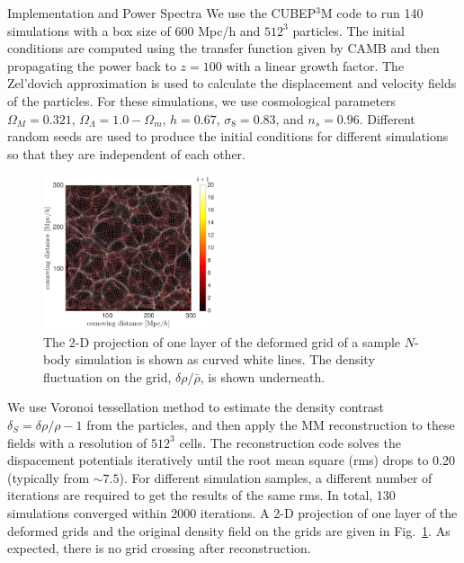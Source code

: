 \begin{section}{Implementation and Power Spectra}
  \label{sec:simulation}
  We use the \textsc{CUBEP$^3$M} code \cite{bib:Harnois2013} to run
  140 simulations with a box size of 600 Mpc/h and $512^3$ particles.
  The initial conditions are computed using the transfer function
  given by CAMB \cite{bib:Lewis2000} and then propagating the power
  back to $z=100$ with a linear growth factor.  The Zel'dovich
  approximation is used to calculate the displacement and velocity
  fields of the particles.  For these simulations, we use cosmological
  parameters $\Omega_M=0.321$, $\Omega_{\Lambda}=1.0-\Omega_m$,
  $h=0.67$, $\sigma_8=0.83$, and $n_s=0.96$.  Different random seeds
  are used to produce the initial conditions for different simulations
  so that they are independent of each other.

  \begin{figure}[h]
    \centering
    \includegraphics[width=0.45\textwidth]{fig1.pdf}
    \caption{ The 2-D projection of one layer of the deformed grid of a sample
      $N$-body simulation is shown as curved white lines.  The
      density fluctuation on the grid, $\delta\rho/\bar{\rho}$, is shown
      underneath.}
    \label{fig:simandrec}
 \end{figure}

  We use Voronoi tessellation method to estimate the density
  contrast $\delta_S=\delta\rho/\rho-1$ from the particles, and then
  apply the MM reconstruction to these fields with a resolution of
  $512^3$ cells.  The reconstruction code solves the dispacement potentials 
  iteratively until the root mean square (rms) drops 
  to 0.20 (typically from $\sim 7.5$). For different simulation samples, a different number of iterations are required to get 
  the results of the same rms. In total, 130 simulations converged within 2000 iterations.
  A 2-D projection of one layer of the deformed grids and the
  original density field on the grids are given in Fig.~\ref{fig:simandrec}.  As
  expected, there is no grid crossing after reconstruction.
 

\end{section}
